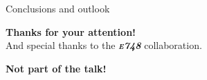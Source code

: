 \documentclass[sans,
frameno, %
mp,
usenames,dvipsnames, %
onlytextwidth, %
t,%
11pt]{beamer}
\newcommand{\iso}[2]{\ce{^{#1}#2}}
\begin{document}
\begin{frame}{Conclusions and outlook }

\end{frame}

\End
\begin{frame}
    \centering
    \textbf{Thanks for your attention!}\\
    And special thanks to the \textbf{\itshape\scshape e748} collaboration.
\end{frame}

\begin{frame}
    \centering
    \textbf{Not part of the talk!}
\end{frame}
\end{document}

